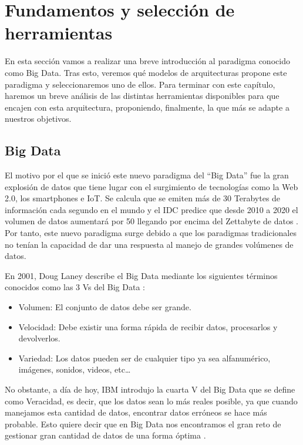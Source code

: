 \chapter{Fundamentos y selección de herramientas\label{FunAndTools}}

En esta sección vamos a realizar una breve introducción al paradigma
conocido como Big Data. Tras esto, veremos qué modelos de arquitecturas
propone este paradigma y seleccionaremos uno de ellos. 
Para terminar con este capítulo, haremos un breve
análisis de las distintas herramientas disponibles para que encajen con
esta arquitectura, proponiendo, finalmente, la que más se adapte a nuestros
objetivos.

\section{Big Data\label{WhatIsBigD}}

El motivo por el que se inició este nuevo paradigma del “Big Data” fue
la gran explosión de datos que tiene lugar con el surgimiento
de tecnologías como la Web 2.0, los smartphones e IoT. Se calcula que
se emiten más de 30 Terabytes de información cada segundo en el mundo
\cite{BD-2} y el IDC predice que desde 2010 a 2020 el volumen de datos
aumentará por 50 llegando por encima del Zettabyte de datos
\cite{BD-2}. Por tanto, este nuevo paradigma surge debido a que los
paradigmas tradicionales no tenían la capacidad de dar una respuesta
al manejo de grandes volúmenes de datos.

En 2001, Doug Laney describe el Big Data mediante los siguientes términos
conocidos como las 3 Vs del Big Data \cite{BD-4}:

\begin{itemize}
\item Volumen: El conjunto de datos debe ser grande.
\item Velocidad: Debe existir una forma rápida de recibir datos,
  procesarlos y devolverlos.
\item Variedad: Los datos pueden ser de cualquier tipo ya sea alfanumérico,
  imágenes, sonidos, videos, etc…
\end{itemize}

No obstante, a día de hoy, IBM introdujo la cuarta V del Big Data que se
define como Veracidad, es decir, que los datos sean lo más reales posible,
ya que cuando manejamos esta cantidad de datos, encontrar datos erróneos se
hace más probable. Esto quiere decir que en Big Data nos encontramos el
gran reto de gestionar gran cantidad de datos de una forma óptima
\cite{BD-5}.

